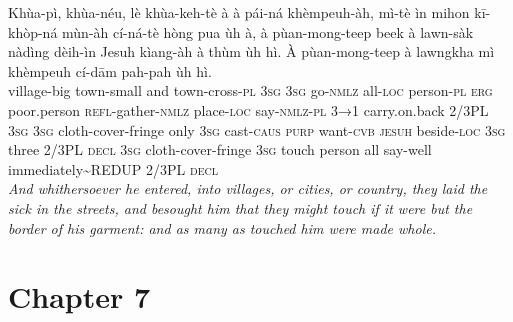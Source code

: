 \documentclass[11pt,a4paper]{article}
\begin{document}
\begin{exe}
\gll Khùa-pì, khùa-néu, lè khùa-keh-tè à à pái-ná khèmpeuh-àh, mì-tè ìn mihon kī-khòp-ná mùn-àh cí-ná-tè hòng pua ùh à, à pùan-mong-teep beek à lawn-sàk nàdìng dèih-ìn Jesuh kìang-àh à thùm ùh hì. À pùan-mong-teep à lawngkha mì khèmpeuh cí-dām pah-pah ùh hì. \\
     village-big town-small and town-cross-\textsc{pl} \textsc{3sg} \textsc{3sg} go-\textsc{nmlz} all-\textsc{loc} person-\textsc{pl} \textsc{erg} poor.person \textsc{refl}-gather-\textsc{nmlz} place-\textsc{loc} say-\textsc{nmlz}-\textsc{pl} \textsc{3→1} carry.on.back 2/3PL \textsc{3sg} \textsc{3sg} cloth-cover-fringe only \textsc{3sg} cast-\textsc{caus} \textsc{purp} want-\textsc{cvb} \textsc{jesuh} beside-\textsc{loc} \textsc{3sg} three 2/3PL \textsc{decl} \textsc{3sg} cloth-cover-fringe \textsc{3sg} touch person all say-well immediately\textasciitilde{}REDUP 2/3PL \textsc{decl} \\
\glt \textcolor{kjvcolor}{\textit{And whithersoever he entered, into villages, or cities, or country, they laid the sick in the streets, and besought him that they might touch if it were but the border of his garment: and as many as touched him were made whole.}}

\end{exe}
\newpage

\section*{Chapter 7}
\end{document}
